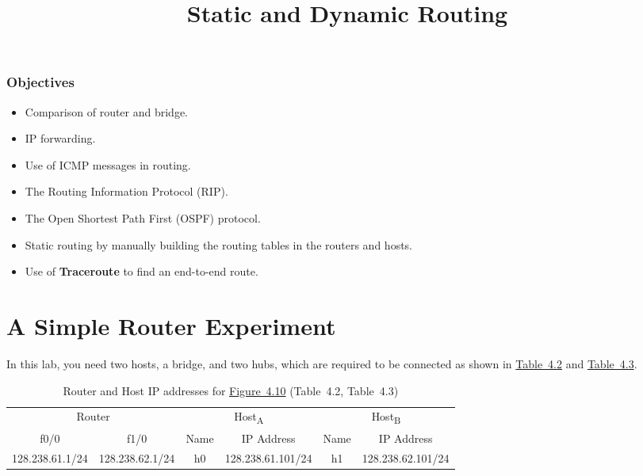 \documentclass{UTNetLab}
\title{Static and Dynamic Routing}
\begin{document}
	\section*{Objectives}
	\begin{itemize}
		\item Comparison of router and bridge.
		\item IP forwarding.
		\item Use of ICMP messages in routing.
		\item The Routing Information Protocol (RIP).
		\item The Open Shortest Path First (OSPF) protocol.
		\item Static routing by manually building the routing tables in the routers and hosts.
		\item Use of \textbf{Traceroute} to find an end-to-end route.
	\end{itemize}
	
\part{A Simple Router Experiment}
In this lab, you need two hosts, a bridge, and two hubs, which are required to be connected as shown in \hyperref[tab:4.2]{Table~4.2} and \hyperref[tab:4.3]{Table~4.3}.
    \begin{table}[H]
        \caption{Router and Host IP addresses for \hyperref[fig:4.10]{Figure~4.10} (Table~4.2\label{tab:4.2}, Table~4.3\label{tab:4.3})}
        \centering
        \begin{tabular}{ *2c | *2c | *2c }
            \hline \hline
            \multicolumn{2}{c|}{Router} & \multicolumn{2}{c|}{Host\textsubscript{A}} & \multicolumn{2}{c}{Host\textsubscript{B}} \\
            f0/0 & f1/0 & Name & IP Address & Name & IP Address \\
            \hline 
            128.238.61.1/24 & 128.238.62.1/24 & h0 & 128.238.61.101/24 & h1 & 128.238.62.101/24 \\
            \hline \hline
            \end{tabular}
    \end{table}
\end{document}
